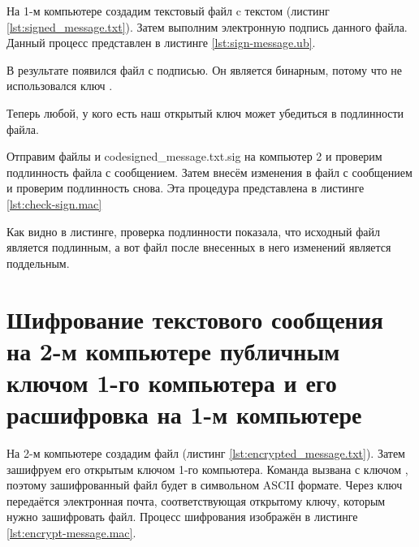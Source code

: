На 1-м компьютере создадим текстовый файл  c текстом  (листинг \ref{lst:signed_message.txt}). Затем выполним электронную подпись данного файла. Данный процесс представлен в листинге \ref{lst:sign-message.ub}.





В результате появился файл  с подписью. Он является бинарным, потому что не использовался ключ .

Теперь любой, у кого есть наш открытый ключ может убедиться в подлинности файла.

Отправим файлы  и code{signed\_message.txt.sig} на компьютер 2 и проверим подлинность файла с сообщением. Затем внесём изменения в файл с сообщением и проверим подлинность снова. Эта процедура представлена в листинге \ref{lst:check-sign.mac}



Как видно в листинге, проверка подлинности показала, что исходный файл является подлинным, а вот файл после внесенных в него изменений является поддельным.

\section{Шифрование текстового сообщения на 2-м компьютере публичным ключом 1-го компьютера и его расшифровка на 1-м компьютере}

На 2-м компьютере создадим файл  (листинг \ref{lst:encrypted_message.txt}). Затем зашифруем его открытым ключом 1-го компьютера. Команда вызвана с ключом , поэтому зашифрованный файл будет в символьном ASCII формате. Через ключ  передаётся электронная почта, соответствующая открытому ключу, которым нужно зашифровать файл. Процесс шифрования изображён в листинге \ref{lst:encrypt-message.mac}.

